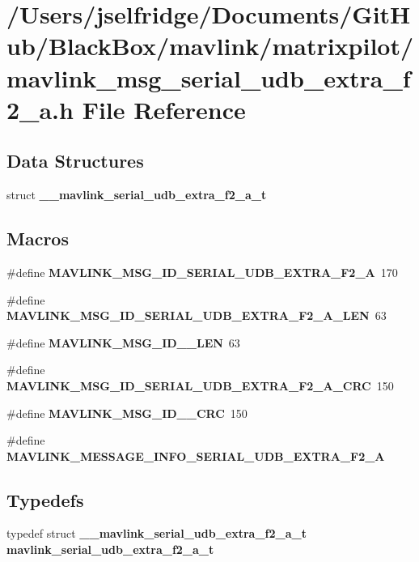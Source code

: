 \section{/\+Users/jselfridge/\+Documents/\+Git\+Hub/\+Black\+Box/mavlink/matrixpilot/mavlink\+\_\+msg\+\_\+serial\+\_\+udb\+\_\+extra\+\_\+f2\+\_\+a.h File Reference}
\label{mavlink__msg__serial__udb__extra__f2__a_8h}
\subsection*{Data Structures}
\begin{DoxyCompactItemize}
\item 
struct \textbf{ \+\_\+\+\_\+mavlink\+\_\+serial\+\_\+udb\+\_\+extra\+\_\+f2\+\_\+a\+\_\+t}
\end{DoxyCompactItemize}
\subsection*{Macros}
\begin{DoxyCompactItemize}
\item 
\#define \textbf{ M\+A\+V\+L\+I\+N\+K\+\_\+\+M\+S\+G\+\_\+\+I\+D\+\_\+\+S\+E\+R\+I\+A\+L\+\_\+\+U\+D\+B\+\_\+\+E\+X\+T\+R\+A\+\_\+\+F2\+\_\+A}~170
\item 
\#define \textbf{ M\+A\+V\+L\+I\+N\+K\+\_\+\+M\+S\+G\+\_\+\+I\+D\+\_\+\+S\+E\+R\+I\+A\+L\+\_\+\+U\+D\+B\+\_\+\+E\+X\+T\+R\+A\+\_\+\+F2\+\_\+\+A\+\_\+\+L\+EN}~63
\item 
\#define \textbf{ M\+A\+V\+L\+I\+N\+K\+\_\+\+M\+S\+G\+\_\+\+I\+D\+\_\+\_\+\+L\+EN}~63
\item 
\#define \textbf{ M\+A\+V\+L\+I\+N\+K\+\_\+\+M\+S\+G\+\_\+\+I\+D\+\_\+\+S\+E\+R\+I\+A\+L\+\_\+\+U\+D\+B\+\_\+\+E\+X\+T\+R\+A\+\_\+\+F2\+\_\+\+A\+\_\+\+C\+RC}~150
\item 
\#define \textbf{ M\+A\+V\+L\+I\+N\+K\+\_\+\+M\+S\+G\+\_\+\+I\+D\+\_\+\_\+\+C\+RC}~150
\item 
\#define \textbf{ M\+A\+V\+L\+I\+N\+K\+\_\+\+M\+E\+S\+S\+A\+G\+E\+\_\+\+I\+N\+F\+O\+\_\+\+S\+E\+R\+I\+A\+L\+\_\+\+U\+D\+B\+\_\+\+E\+X\+T\+R\+A\+\_\+\+F2\+\_\+A}
\end{DoxyCompactItemize}
\subsection*{Typedefs}
\begin{DoxyCompactItemize}
\item 
typedef struct \textbf{ \+\_\+\+\_\+mavlink\+\_\+serial\+\_\+udb\+\_\+extra\+\_\+f2\+\_\+a\+\_\+t} \textbf{ mavlink\+\_\+serial\+\_\+udb\+\_\+extra\+\_\+f2\+\_\+a\+\_\+t}
\end{DoxyCompactItemize}


